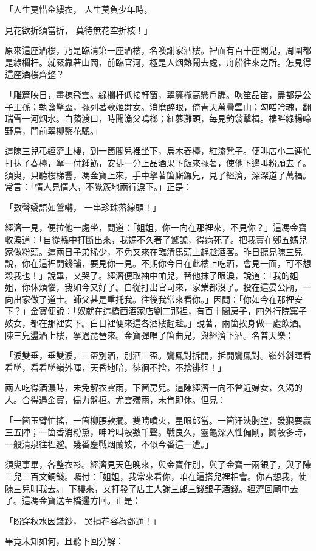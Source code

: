 「人生莫惜金縷衣，  人生莫負少年時，

見花欲折須當折，  莫待無花空折枝！」

原來這座酒樓，乃是臨清第一座酒樓，名喚謝家酒樓。裡面有百十座閣兒，周圍都是綠欄杆。就緊靠著山岡，前臨官河，極是人烟熱鬧去處，舟船往來之所。怎見得這座酒樓齊整？

「雕簷映日，畫棟飛雲。綠欄杆低接軒窗，翠簾櫳高懸戶牖。吹笙品笛，盡都是公子王孫；執盞擎盃，擺列著歌姬舞女。消磨醉眼，倚青天萬疊雲山；勾喏吟魂，翻瑞雪一河烟水。白蘋渡口，時聞漁父鳴榔；紅蓼灘頭，每見釣翁擊楫。樓畔綠楊啼野鳥，門前翠柳繫花驄。」

這陳三兒弔經濟上樓，到一箇閣兒裡坐下，烏木春檯，紅漆凳子。便叫店小二連忙打抹了春檯，拏一付鍾筯，安排一分上品酒果下飯來擺著，使他下邊叫粉頭去了。須臾，只聽樓梯響，馮金寶上來，手中拏著箇廝鑼兒，見了經濟，深深道了萬福。常言：「情人見情人，不覺簇地兩行淚下。」正是：

「數聲嬌語如鶯囀，  一串珍珠落線頭！」

經濟一見，便拉他一處坐，問道：「姐姐，你一向在那裡來，不見你？」這馮金寶收淚道：「自從縣中打斷出來，我媽不久著了驚諕，得病死了。把我賣在鄭五媽兒家做粉頭。這兩日子弟稀少，不免又來在臨清馬頭上趕趁酒客。昨日聽見陳三兒說，你在這裡開錢舖，要見你一見。不期你今日在此樓上吃酒，會見一面，可不想殺我也！」說畢，又哭了。經濟便取袖中帕兒，替他抹了眼淚，說道：「我的姐姐，你休煩惱，我如今又好了。自從打出官司來，家業都沒了。投在這晏公廟，一向出家做了道士。師父甚是重托我。往後我常來看你。」因問：「你如今在那裡安下？」金寶便說：「奴就在這橋西酒家店劉二那裡，有百十間房子，四外行院窠子妓女，都在那裡安下。白日裡便來這各酒樓趕趁。」說著，兩箇挨身做一處飲酒。陳三兒盪酒上樓，拏過琵琶來。金寶彈唱了箇曲兒，與經濟下酒。名普天樂：

「淚雙垂，垂雙淚，三盃別酒，別酒三盃。鸞鳳對拆開，拆開鸞鳳對。嶺外斜暉看看墜，看看墜嶺外暉，天昏地暗，徘徊不捨，不捨徘徊！」

兩人吃得酒濃時，未免解衣雲雨，下箇房兒。這陳經濟一向不曾近婦女，久渴的人。合得遇金寶，儘力盤桓。尤雲殢雨，未肯即休。但見：

「一箇玉臂忙搖，一箇柳腰款擺。雙睛噴火，星眼郎當。一箇汗浹胸膛，發狠要贏三五陣；一箇香消粉黛，呻吟叫彀數千聲。戰良久，靈龜深入性偏剛，鬬彀多時，一般清泉往裡邈。幾番鏖戰烟蘭妓，不似今番這一遭。」

須臾事畢，各整衣衫。經濟見天色晚來，與金寶作別，與了金寶一兩銀子，與了陳三兒三百文銅錢。囑付：「姐姐，我常來看你，咱在這搭兒裡相會。你若想我，使陳三兒叫我去。」下樓來，又打發了店主人謝三郎三錢銀子酒錢。經濟回廟中去了。這馮金寶送至橋邊方回。正是：

「盼穿秋水因錢鈔，  哭損花容為鄧通！」

畢竟未知如何，且聽下回分解：

